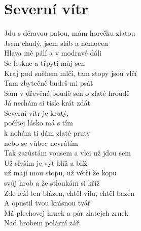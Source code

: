 \section{Severní vítr}
\onehalfspacing

Jdu s děravou patou, mám horečku zlatou\\
Jsem chudý, jsem sláb a nemocen\\
Hlava mě pálí a v modravé dáli\\
Se leskne a třpytí můj sen\\

Kraj pod sněhem mlčí, tam stopy jsou vlčí\\
Tam zbytečně budeš mi psát\\
Sám v dřevěné boudě sen o zlaté hroudě\\
Já nechám si tisíc krát zdát\\

{}Severní vítr je krutý, \\
počítej lásko má s tím\\
k nohám ti dám zlaté pruty\\
nebo se vůbec nevrátím\\

Tak zarůstám vousem a vlci už jdou sem\\
Už slyším je výt blíž a blíž\\
už mají mou stopu, už větří že kopu\\
svůj hrob a že stloukám si kříž\\
Zde leží ten blázen, chtěl vilu, chtěl bazén\\
A opustil tvou krásnou tvář\\
Má plechovej hrnek a pár zlatejch zrnek\\
Nad hrobem polární zář.\\